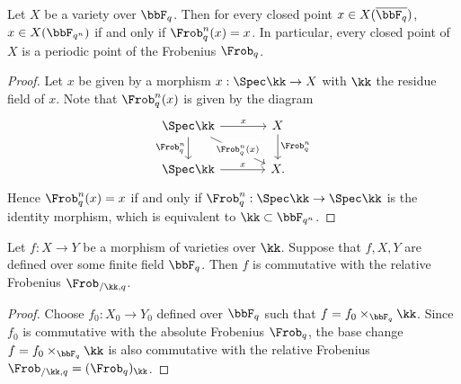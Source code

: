   \begin{proposition}
    Let $X$ be a variety over $\bbF_{q}$.
    Then for every closed point $x \in X(\overline{\bbF_q})$, $x \in X(\bbF_{q^n})$ if and only if $\Frob_{q}^n(x) = x$.
    In particular, every closed point of $X$ is a periodic point of the Frobenius $\Frob_q$.
  \end{proposition}
  \begin{proof}
    Let $x$ be given by a morphism $x: \Spec \kk \to X$ with $\kk$ the residue field of $x$.
    Note that $\Frob_q^n(x)$ is given by the diagram
    \[ \begin{tikzcd}[column sep=large]
      \Spec \kk \arrow[r, "x"] \arrow[rd, "\Frob_q^n(x)" description] \arrow[d,"\Frob_q^n"'] & X \arrow[d, "\Frob_q^n"] \\
      \Spec \kk \arrow[r, "x"] & X.
    \end{tikzcd} \]
    Hence $\Frob_q^n(x) = x$ if and only if $\Frob_q^n: \Spec \kk \to \Spec \kk$ is the identity morphism, which is equivalent to $\kk \subset \bbF_{q^n}$.
  \end{proof}

  \begin{proposition}
    Let $f: X \to Y$ be a morphism of varieties over $\kk$.
    Suppose that $f,X,Y$ are defined over some finite field $\bbF_q$.
    Then $f$ is commutative with the relative Frobenius $\Frob_{/\kk,q}$.
  \end{proposition}
  \begin{proof}
    Choose $f_0: X_0 \to Y_0$ defined over $\bbF_q$ such that $f = f_0 \times_{\bbF_q} \kk$.
    Since $f_0$ is commutative with the absolute Frobenius $\Frob_q$, the base change $f = f_0 \times_{\bbF_q} \kk$ is also commutative with the relative Frobenius $\Frob_{/\kk,q} = (\Frob_q)_\kk$.
  \end{proof}


